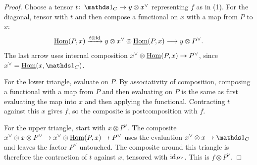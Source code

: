 	\begin{proof}
		Choose a tensor $t\colon\unit_C\to y\otimes x^\vee$ representing $f$ as in (1). For the diagonal, tensor with $t$ and then compose a functional on $x$ with a map from $P$ to $x$:
		\[
			\operatorname{\underline{\operatorname{Hom}}}(P,x)\xrightarrow{t\otimes\operatorname{id}}
			y\otimes x^\vee\otimes\operatorname{\underline{\operatorname{Hom}}}(P,x)\longrightarrow y\otimes P^\vee.
		\]
		The last arrow uses internal composition $x^\vee\otimes\operatorname{\underline{\operatorname{Hom}}}(P,x)\to P^\vee$, since $x^\vee=\iHom(x,\unit_C)$.

		For the lower triangle, evaluate on $P$. By associativity of composition, composing a functional with a map from $P$ and then evaluating on $P$ is the same as first evaluating the map into $x$ and then applying the functional. Contracting $t$ against this $x$ gives $f$, so the composite is postcomposition with $f$.

		For the upper triangle, start with $x\otimes P^\vee$. The composite $x^\vee\otimes x\otimes P^\vee\to x^\vee\otimes\operatorname{\underline{\operatorname{Hom}}}(P,x)\to P^\vee$ uses the evaluation $x^\vee\otimes x\to\unit_C$ and leaves the factor $P^\vee$ untouched. The composite around this triangle is therefore the contraction of $t$ against $x$, tensored with $\operatorname{id}_{P^\vee}$. This is $f\otimes P^\vee$.
	\end{proof}

